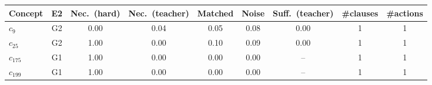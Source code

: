 \begin{tabular}{lcccccccc}
\toprule
Concept & E2 & Nec.\ (hard) & Nec.\ (teacher) & Matched & Noise & Suff.\ (teacher) & \#clauses & \#actions \\
\midrule
$c_{9}$ & G2 & 0.00 & 0.04 & 0.05 & 0.08 & 0.00 & 1 & 1 \\
$c_{25}$ & G2 & 1.00 & 0.00 & 0.10 & 0.09 & 0.00 & 1 & 1 \\
$c_{175}$ & G1 & 1.00 & 0.00 & 0.00 & 0.00 & -- & 1 & 1 \\
$c_{199}$ & G1 & 1.00 & 0.00 & 0.00 & 0.00 & -- & 1 & 1 \\
\bottomrule
\end{tabular}
